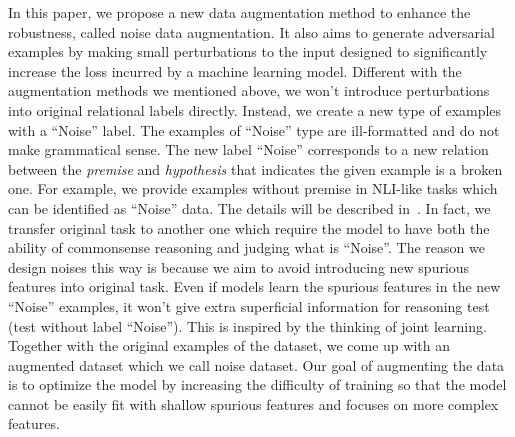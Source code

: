 In this paper, we propose a new data augmentation method
to enhance the robustness, called noise data augmentation. 
It also aims to generate adversarial examples by making small 
perturbations to the input designed to significantly increase 
the loss incurred by a machine learning model. Different with the 
augmentation methods we mentioned above, we won't introduce 
perturbations into original relational labels directly. Instead, we create 
a new type of examples with a ``Noise'' label. 
The examples of ``Noise'' type are ill-formatted and do not make
grammatical sense. The new label ``Noise'' corresponds to a new relation between the \textit{premise} and \textit{hypothesis} that indicates the given example is a broken one.
For example, we provide examples without premise 
in NLI-like tasks which can be identified as ``Noise'' data. The details will be described 
in~. In fact, 
we transfer original task to another one which require the model to 
have both the ability of commonsense reasoning and judging what is ``Noise''. 
The reason we design noises this way is because we aim to avoid 
introducing new spurious features into original task. Even if models learn the spurious 
features in the new ``Noise'' examples, it won't give extra superficial information 
for reasoning test (test without label ``Noise''). This is inspired by the thinking of joint learning.
Together with the original examples of the dataset, we come up with an augmented dataset
which we call noise dataset. 
Our goal of augmenting the data is to optimize 
the model by increasing the difficulty of training so that the model cannot be easily
fit with shallow spurious features and focuses on more complex features.

